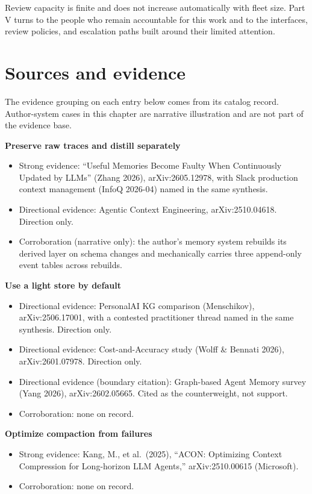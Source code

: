 Review capacity is finite and does not increase automatically with fleet size. Part V turns to the people who remain accountable for this work and to the interfaces, review policies, and escalation paths built around their limited attention.

\section*{Sources and evidence}

The evidence grouping on each entry below comes from its catalog record. Author-system cases in this chapter are narrative illustration and are not part of the evidence base.

\textbf{Preserve raw traces and distill separately}

\begin{itemize}
\tightlist
\item
  Strong evidence: ``Useful Memories Become Faulty When Continuously Updated by LLMs'' (Zhang 2026), arXiv:2605.12978, with Slack production context management (InfoQ 2026-04) named in the same synthesis.
\item
  Directional evidence: Agentic Context Engineering, arXiv:2510.04618. Direction only.
\item
  Corroboration (narrative only): the author's memory system rebuilds its derived layer on schema changes and mechanically carries three append-only event tables across rebuilds.
\end{itemize}

\textbf{Use a light store by default}

\begin{itemize}
\tightlist
\item
  Directional evidence: PersonalAI KG comparison (Menschikov), arXiv:2506.17001, with a contested practitioner thread named in the same synthesis. Direction only.
\item
  Directional evidence: Cost-and-Accuracy study (Wolff \& Bennati 2026), arXiv:2601.07978. Direction only.
\item
  Directional evidence (boundary citation): Graph-based Agent Memory survey (Yang 2026), arXiv:2602.05665. Cited as the counterweight, not support.
\item
  Corroboration: none on record.
\end{itemize}

\textbf{Optimize compaction from failures}

\begin{itemize}
\tightlist
\item
  Strong evidence: Kang, M., et al.~(2025), ``ACON: Optimizing Context Compression for Long-horizon LLM Agents,'' arXiv:2510.00615 (Microsoft).
\item
  Corroboration: none on record.
\end{itemize}

